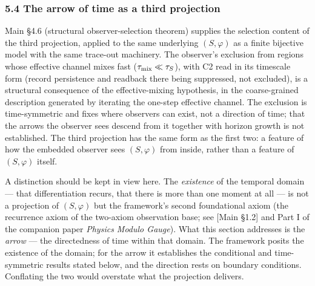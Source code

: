 \documentclass[
]{article}
\begin{document}
\hypertarget{the-arrow-of-time-as-a-third-projection}{%
\subsubsection{5.4 The arrow of time as a third
projection}\label{the-arrow-of-time-as-a-third-projection}}

Main §4.6 (structural observer-selection theorem) supplies the selection
content of the third projection, applied to the same underlying
\((S,\varphi)\) as a finite bijective model with the same trace-out
machinery. The observer's exclusion from regions whose effective channel
mixes fast (\(\tau_{\rm mix} \ll \tau_S\)), with C2 read in its
timescale form (record persistence and readback there being suppressed,
not excluded), is a structural consequence of the effective-mixing
hypothesis, in the coarse-grained description generated by iterating the
one-step effective channel. The exclusion is time-symmetric and fixes
where observers can exist, not a direction of time; that the arrows the
observer sees descend from it together with horizon growth is not
established. The third projection has the same form as the first two: a
feature of how the embedded observer sees \((S, \varphi)\) from inside,
rather than a feature of \((S, \varphi)\) itself.

A distinction should be kept in view here. The \emph{existence} of the
temporal domain --- that differentiation recurs, that there is more than
one moment at all --- is not a projection of \((S, \varphi)\) but the
framework's second foundational axiom (the recurrence axiom of the
two-axiom observation base; see {[}Main §1.2{]} and Part I of the
companion paper \emph{Physics Modulo Gauge}). What this section
addresses is the \emph{arrow} --- the directedness of time within that
domain. The framework posits the existence of the domain; for the arrow
it establishes the conditional and time-symmetric results stated below,
and the direction rests on boundary conditions. Conflating the two would
overstate what the projection delivers.
\end{document}
